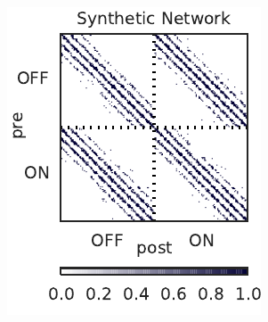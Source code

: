 \begin{figure}[t!]
\begin{subfigure}[b]{1.8in}
    \label{fig:synth_rgc_bfgs_conn}
  \end{subfigure} \\
  \begin{subfigure}[b]{1.8in}
    \centering
    \caption{}
    \vspace{-.25in}
    \includegraphics[width=\textwidth]{figures/ch5/synth_rgc_true_sparsity.pdf}
    \label{fig:synth_rgc_true_sparsity}
  \end{subfigure}
  ~
  \begin{subfigure}[b]{1.8in}
    \centering
    \caption{}
    \vspace{-.25in}

\end{subfigure}
\end{figure}
